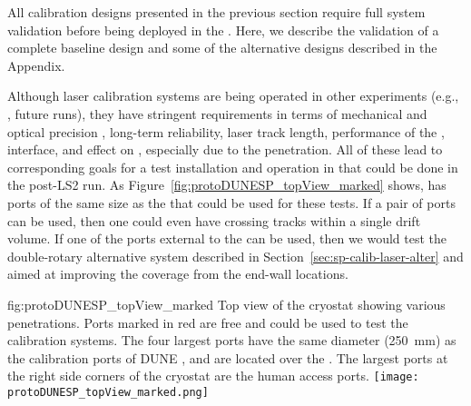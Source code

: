 
All calibration designs presented in the previous section require full system validation before being deployed in the  . Here, we describe the validation of a complete baseline design and some of the alternative designs described in the Appendix.

Although laser calibration systems are being operated in other  experiments (e.g., , future  runs), they have stringent requirements in terms of mechanical and optical precision , long-term reliability, laser track length, performance of the ,  interface, and effect on \efield, especially due to the  penetration. 
All of these lead to corresponding goals for a test installation and operation in  that could be done in the post-LS2 run. As Figure~\ref{fig:protoDUNESP_topView_marked} shows,  has ports of the same size as the   that could be used for these tests. If a pair of ports can be used, then one could even have crossing tracks within a single drift volume. If one of the ports external to the  can be used, then we would test the double-rotary alternative system described in Section~\ref{sec:sp-calib-laser-alter} and aimed at improving the coverage from the end-wall locations.

\begin{dunefigure}{fig:protoDUNESP_topView_marked}
{Top view of the  cryostat showing various penetrations. Ports marked in red are free and could be used to test the calibration systems. The four largest ports have the same diameter (\SI{250}{\milli\m}) as the calibration ports of DUNE , and are located over the . The largest ports at the right side corners of the cryostat are the human access ports.}
\texttt{[image: protoDUNESP\_topView\_marked.png]}
\end{dunefigure}

